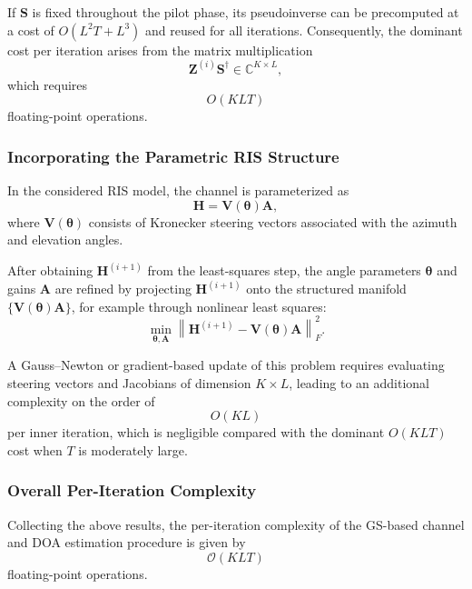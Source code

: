 \documentclass[journal]{IEEEtran}
\begin{document}
If $\mathbf S$ is fixed throughout the pilot phase, its pseudoinverse can be
precomputed at a cost of $O(L^2T + L^3)$ and reused for all iterations.
Consequently, the dominant cost per iteration arises from the matrix
multiplication
\begin{equation}
\mathbf Z^{(i)} \mathbf S^\dagger \in \mathbb C^{K\times L},
\end{equation}
which requires
\begin{equation}
O(KLT)
\end{equation}
floating-point operations.

\subsubsection{Incorporating the Parametric RIS Structure}

In the considered RIS model, the channel is parameterized as
\begin{equation}
\mathbf H = \mathbf V(\boldsymbol\theta)\mathbf A,
\end{equation}
where $\mathbf V(\boldsymbol\theta)$ consists of Kronecker steering vectors
associated with the azimuth and elevation angles.

After obtaining $\mathbf H^{(i+1)}$ from the least-squares step,
the angle parameters $\boldsymbol\theta$ and gains $\mathbf A$ are refined
by projecting $\mathbf H^{(i+1)}$ onto the structured manifold
$\{\mathbf V(\boldsymbol\theta)\mathbf A\}$,
for example through nonlinear least squares:
\begin{equation}
\min_{\boldsymbol\theta,\mathbf A}
\left\|
\mathbf H^{(i+1)} - \mathbf V(\boldsymbol\theta)\mathbf A
\right\|_F^2 .
\end{equation}

A Gauss--Newton or gradient-based update of this problem requires evaluating
steering vectors and Jacobians of dimension $K\times L$, leading to an
additional complexity on the order of
\begin{equation}
O(KL)
\end{equation}
per inner iteration, which is negligible compared with the dominant
$O(KLT)$ cost when $T$ is moderately large.

\subsubsection{Overall Per-Iteration Complexity}

Collecting the above results, the per-iteration complexity of the GS-based
channel and DOA estimation procedure is given by
\begin{equation}
\boxed{
\mathcal O(KLT)
}
\end{equation}
floating-point operations.
\end{document}
